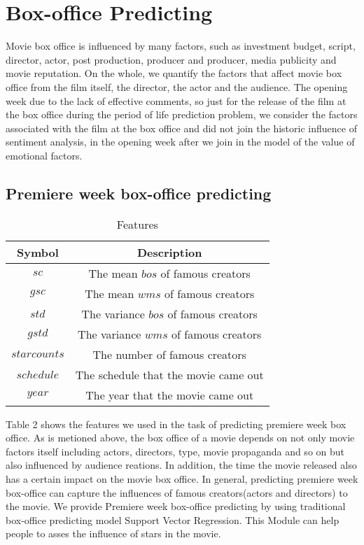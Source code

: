 \section{Box-office Predicting}
Movie box office is influenced by many factors, such as investment budget, script, director, actor, post production, producer and producer, media publicity and movie reputation. On the whole, we quantify the factors that affect movie box office from the film itself, the director, the actor and the audience. The opening week due to the lack of effective comments, so just for the release of the film at the box office during the period of life prediction problem, we consider the factors associated with the film at the box office and did not join the historic influence of sentiment analysis, in the opening week after we join in the model of the value of emotional factors.

\label{sec:predict}
\subsection{Premiere week box-office predicting}
\begin{table}[!htb]
  \centering
\begin{tabular}{|c|c|}
\hline
Symbol&Description\\
\hline
$sc$ &The mean $bos$ of famous creators\\
\hline
$gsc$&The mean $wms$ of famous creators\\
\hline
$std$&The variance $bos$ of famous creators\\
\hline
$gstd$&The variance $wms$ of famous creators\\
\hline
$starcounts$& The number of famous creators\\
\hline
$schedule$ & The schedule that the movie came out\\
\hline
$year$ & The year that the movie came out\\
\hline
\end{tabular}
  \caption{Features}
\end{table}
\par Table 2 shows the features we used in the task of predicting premiere week box office. As is metioned above, the box office of a movie depends on not only movie factors itself including actors, directors, type, movie propaganda and so on but also influenced by audience reations. In addition, the time the movie released also has a certain impact on the movie box office. In general, predicting premiere week box-office can capture the influences of famous creators(actors and directors) to the movie. We provide Premiere week box-office predicting by using traditional box-office predicting model Support Vector Regression. This Module can help people to asses the influence of stars in the movie.

